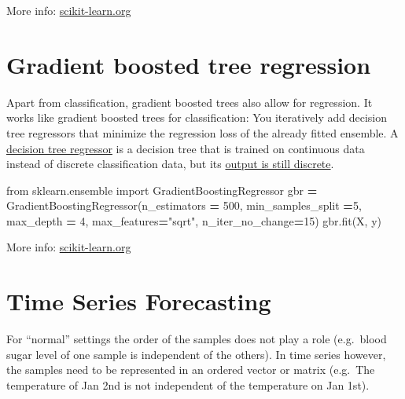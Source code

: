\documentclass[
]{book}
\newenvironment{Shaded}{\begin{snugshade}}{\end{snugshade}}
\newcommand{\DecValTok}[1]{\textcolor[rgb]{0.00,0.00,0.81}{#1}}
\newcommand{\ImportTok}[1]{#1}
\newcommand{\NormalTok}[1]{#1}
\newcommand{\OperatorTok}[1]{\textcolor[rgb]{0.81,0.36,0.00}{\textbf{#1}}}
\newcommand{\StringTok}[1]{\textcolor[rgb]{0.31,0.60,0.02}{#1}}
\begin{document}
More info:
\href{https://scikit-learn.org/stable/modules/generated/sklearn.gaussian_process.GaussianProcessRegressor.html}{scikit-learn.org}\\

\hypertarget{gradient-boosted-tree-regression}{%
\section{Gradient boosted tree regression}\label{gradient-boosted-tree-regression}}

Apart from classification, gradient boosted trees also allow for
regression. It works like gradient boosted trees for classification: You
iteratively add decision tree regressors that minimize the regression
loss of the already fitted ensemble. A \href{https://scikit-learn.org/stable/auto_examples/tree/plot_tree_regression.html}{decision tree
regressor}
is a decision tree that is trained on continuous data instead of
discrete classification data, but its \href{https://medium.com/analytics-vidhya/regression-trees-decision-tree-for-regression-machine-learning-e4d7525d8047}{output is still
discrete}.

\begin{Shaded}
\begin{Highlighting}[]
\ImportTok{from}\NormalTok{ sklearn.ensemble }\ImportTok{import}\NormalTok{ GradientBoostingRegressor}
\NormalTok{gbr }\OperatorTok{=}\NormalTok{ GradientBoostingRegressor(n\_estimators }\OperatorTok{=} \DecValTok{500}\NormalTok{, min\_samples\_split }\OperatorTok{=}\DecValTok{5}\NormalTok{, max\_depth }\OperatorTok{=} \DecValTok{4}\NormalTok{, max\_features}\OperatorTok{=}\StringTok{"sqrt"}\NormalTok{, n\_iter\_no\_change}\OperatorTok{=}\DecValTok{15}\NormalTok{)}
\NormalTok{gbr.fit(X, y)}
\end{Highlighting}
\end{Shaded}

More info:
\href{https://scikit-learn.org/stable/modules/generated/sklearn.ensemble.GradientBoostingRegressor.html}{scikit-learn.org}\\

\hypertarget{time-series-forecasting}{%
\section{Time Series Forecasting}\label{time-series-forecasting}}

For ``normal'' settings the order of the samples does not play a role
(e.g.~blood sugar level of one sample is independent of the others). In
time series however, the samples need to be represented in an ordered
vector or matrix (e.g.~The temperature of Jan 2nd is not independent of
the temperature on Jan 1st).
\end{document}
